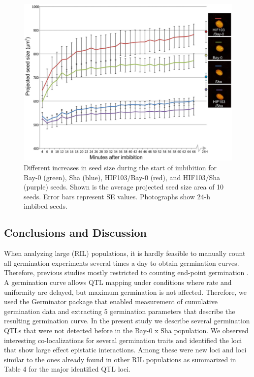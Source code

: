 \begin{figure}[h!]
  \centering
  \includegraphics[keepaspectratio,scale=0.30]{eps/image_3_1_9.eps}
  \caption[Seed Swelling.]{Different increases in seed size during the start of imbibition for Bay-0 (green), Sha (blue), 
          HIF103/Bay-0 (red), and HIF103/Sha (purple) seeds. Shown is the average projected seed size area of 10 seeds. 
          Error bars represent SE values. Photographs show 24-h imbibed seeds.}
          \label{fig:swelling}
\end{figure}

\subsection{Conclusions and Discussion}
When analyzing large (RIL) populations, it is hardly feasible to manually count all germination 
experiments several times a day to obtain germination curves. Therefore, previous studies mostly 
restricted to counting end-point germination \cite{Quesada:2002, Alonso-Blanco:2003, Clerkx:2004, 
Laserna:2008, Meng:2008, Bentsink:2010, Galpaz:2010, Vallejo:2010}. A germination curve allows QTL 
mapping under conditions where rate and uniformity are delayed, but maximum germination is not 
affected. Therefore, we used the Germinator package \cite{Joosen:2010} that enabled measurement 
of cumulative germination data and extracting 5 germination parameters that describe the resulting 
germination curve. In the present study we describe several germination QTLs that were not detected 
before in the Bay-0 x Sha population. We observed interesting co-localizations for several germination 
traits and identified the loci that show large effect epistatic interactions. Among these were new 
loci and loci similar to the ones already found in other RIL populations as summarized in Table 4 for 
the major identified QTL loci.

